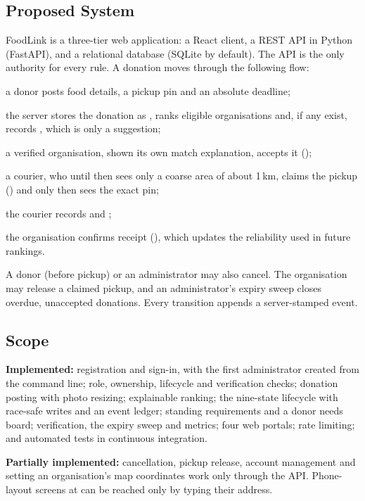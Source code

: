 \subsection{Proposed System}
\label{sec:proposed}

FoodLink is a three-tier web application: a React client, a REST API in Python
(FastAPI), and a relational database (SQLite by default). The API is the only
authority for every rule. A donation moves through the following flow:
\begin{enumerate*}[label=(\arabic*)]
  \item a donor posts food details, a pickup pin and an absolute deadline;
  \item the server stores the donation as , ranks eligible
    organisations and, if any exist, records , which is only a
    suggestion;
  \item a verified organisation, shown its own match explanation, accepts it
    ();
  \item a courier, who until then sees only a coarse area of about 1\,km, claims
    the pickup () and only then sees the exact pin;
  \item the courier records  and ;
  \item the organisation confirms receipt (), which updates the
    reliability used in future rankings.
\end{enumerate*}
A donor (before pickup) or an administrator may also cancel. The organisation
may release a claimed pickup, and an administrator's expiry sweep closes
overdue, unaccepted donations. Every transition appends a server-stamped event.

\subsection{Scope}
\label{sec:scope}

\textbf{Implemented:} registration and sign-in, with the first administrator
created from the command line; role, ownership, lifecycle and verification
checks; donation posting with photo resizing; explainable ranking; the
nine-state lifecycle with race-safe writes and an event ledger; standing
requirements and a donor needs board; verification, the expiry sweep and
metrics; four web portals; rate limiting; and automated tests in continuous
integration.

\textbf{Partially implemented:} cancellation, pickup release, account
management and setting an organisation's map coordinates work only through the
API. Phone-layout screens at  can be reached only by typing their
address.

